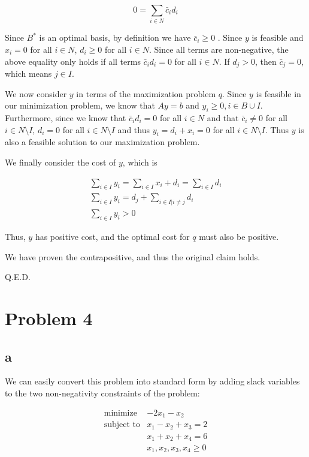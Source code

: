 \documentclass[11pt,a4paper]{article}
\begin{document}
$$
0=\sum_{i\in N}\bar{c}_id_i
$$

Since $B^*$ is an optimal basis, by definition we have $\bar{c}_i\geq 0$ . Since $y$ is feasible and $x_i=0$ for all $i\in N$, $d_i\geq 0$ for all $i\in N$. Since all terms are non-negative, the above equality only holds if all terms $\bar{c}_id_i=0$ for all $i\in N$. If $d_j>0$, then $\bar{c}_j=0$, which means $j\in I$.

We now consider $y$ in terms of the maximization problem $q$. Since $y$ is feasible in our minimization problem, we know that $Ay=b$ and $y_i\geq 0, i\in B\cup I$. Furthermore, since we know that $\bar{c}_id_i=0$ for all $i\in N$ and that $\bar{c}_i\neq 0$ for all $i\in N\texttt{\textbackslash}I$, $d_i=0$ for all $i\in N\texttt{\textbackslash}I$ and thus $y_i=d_i+x_i=0$ for all $i\in N\texttt{\textbackslash}I$. Thus $y$ is also a feasible solution to our maximization problem.

We finally consider the cost of $y$, which is

\begin{equation}
\begin{split}
\sum_{i\in I} y_i =\sum_{i\in I} x_i+d_i=\sum_{i\in I}d_i\\
\sum_{i\in I} y_i = d_j +\sum_{i\in I|i\neq j}d_i\\
\sum_{i\in I} y_i > 0
\end{split}
\end{equation}

Thus, $y$ has positive cost, and the optimal cost for $q$ must also be positive.

We have proven the contrapositive, and thus the original claim holds.

Q.E.D.

\section{Problem 4}
\subsection{a}

We can easily convert this problem into standard form by adding slack variables to the two non-negativity constraints of the problem:

$$
\begin{array}{ll}
\text{minimize}  & -2x_1-x_2\\
\text{subject to}& x_1-x_2+x_3=2\\
                 & x_1+x_2+x_4=6\\
                 & x_1, x_2, x_3, x_4\geq 0\\
\end{array}
$$
\end{document}
